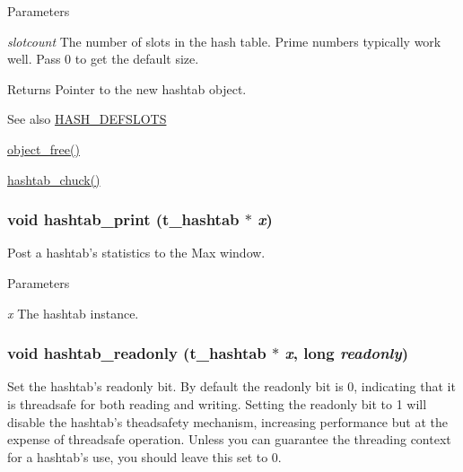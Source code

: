 \begin{DoxyParams}{Parameters}
\item[{\em slotcount}]The number of slots in the hash table. Prime numbers typically work well. Pass 0 to get the default size. \end{DoxyParams}
\begin{DoxyReturn}{Returns}
Pointer to the new hashtab object.
\end{DoxyReturn}
\begin{DoxySeeAlso}{See also}
\hyperlink{group__hashtab_ga160118a25646d04cce8c75f6f3eb9207}{HASH\_\-DEFSLOTS} 

\hyperlink{group__obj_ga3759846cb356195532c41e35b87522ee}{object\_\-free()} 

\hyperlink{group__hashtab_gac3203c76c8321cde39088beab8b4d2e8}{hashtab\_\-chuck()} 
\end{DoxySeeAlso}
\hypertarget{group__hashtab_gaede9b374c667cce86eeb976940eb9c53}{
\subsubsection[{hashtab\_\-print}]{\setlength{\rightskip}{0pt plus 5cm}void hashtab\_\-print ({\bf t\_\-hashtab} $\ast$ {\em x})}}
\label{group__hashtab_gaede9b374c667cce86eeb976940eb9c53}


Post a hashtab's statistics to the Max window. 
\begin{DoxyParams}{Parameters}
\item[{\em x}]The hashtab instance. \end{DoxyParams}
\hypertarget{group__hashtab_ga34ced5b4da65b4068829f799a53ea6bf}{
\subsubsection[{hashtab\_\-readonly}]{\setlength{\rightskip}{0pt plus 5cm}void hashtab\_\-readonly ({\bf t\_\-hashtab} $\ast$ {\em x}, \/  long {\em readonly})}}
\label{group__hashtab_ga34ced5b4da65b4068829f799a53ea6bf}


Set the hashtab's readonly bit. By default the readonly bit is 0, indicating that it is threadsafe for both reading and writing. Setting the readonly bit to 1 will disable the hashtab's theadsafety mechanism, increasing performance but at the expense of threadsafe operation. Unless you can guarantee the threading context for a hashtab's use, you should leave this set to 0.


